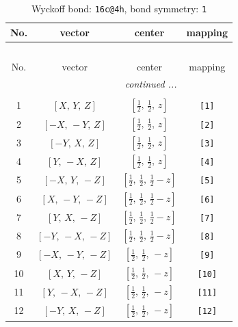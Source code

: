 \documentclass[fleqn,8pt]{jsarticle}
\begin{document}
\begin{longtable}{cccc}
\caption{Wyckoff bond: {\tt 16c@4h}, bond symmetry: {\tt 1}}
 \\
 \hline \hline
No. & vector & center & mapping \\ \hline \endfirsthead

\multicolumn{3}{l}{\tablename\ \thetable{}} \\
 \hline \hline
No. & vector & center & mapping \\ \hline \endhead

 \hline \hline
\multicolumn{3}{r}{\footnotesize\it continued ...} \\ \endfoot

 \hline \hline
\multicolumn{3}{r}{} \\ \endlastfoot

1 & $\left[ X,\, Y,\, Z \right]$ & $\left[ \frac{1}{2},\, \frac{1}{2},\, z \right]$ & {\tt [1]} \\ \hline
2 & $\left[ - X,\, - Y,\, Z \right]$ & $\left[ \frac{1}{2},\, \frac{1}{2},\, z \right]$ & {\tt [2]} \\ \hline
3 & $\left[ - Y,\, X,\, Z \right]$ & $\left[ \frac{1}{2},\, \frac{1}{2},\, z \right]$ & {\tt [3]} \\ \hline
4 & $\left[ Y,\, - X,\, Z \right]$ & $\left[ \frac{1}{2},\, \frac{1}{2},\, z \right]$ & {\tt [4]} \\ \hline
5 & $\left[ - X,\, Y,\, - Z \right]$ & $\left[ \frac{1}{2},\, \frac{1}{2},\, \frac{1}{2} - z \right]$ & {\tt [5]} \\ \hline
6 & $\left[ X,\, - Y,\, - Z \right]$ & $\left[ \frac{1}{2},\, \frac{1}{2},\, \frac{1}{2} - z \right]$ & {\tt [6]} \\ \hline
7 & $\left[ Y,\, X,\, - Z \right]$ & $\left[ \frac{1}{2},\, \frac{1}{2},\, \frac{1}{2} - z \right]$ & {\tt [7]} \\ \hline
8 & $\left[ - Y,\, - X,\, - Z \right]$ & $\left[ \frac{1}{2},\, \frac{1}{2},\, \frac{1}{2} - z \right]$ & {\tt [8]} \\ \hline
9 & $\left[ - X,\, - Y,\, - Z \right]$ & $\left[ \frac{1}{2},\, \frac{1}{2},\, - z \right]$ & {\tt [9]} \\ \hline
10 & $\left[ X,\, Y,\, - Z \right]$ & $\left[ \frac{1}{2},\, \frac{1}{2},\, - z \right]$ & {\tt [10]} \\ \hline
11 & $\left[ Y,\, - X,\, - Z \right]$ & $\left[ \frac{1}{2},\, \frac{1}{2},\, - z \right]$ & {\tt [11]} \\ \hline
12 & $\left[ - Y,\, X,\, - Z \right]$ & $\left[ \frac{1}{2},\, \frac{1}{2},\, - z \right]$ & {\tt [12]} \\ \hline

\end{longtable}
\end{document}
